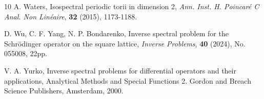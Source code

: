 \documentclass[12pt,letterpaper]{amsart}
\begin{document}
\begin{thebibliography}{10}
 A. Waters,
Isospectral periodic torii in dimension 2,
\emph{Ann. Inst. H. Poincar\'{e} C Anal. Non Lin\'{e}aire}, \textbf{32} (2015), 1173-1188.

 D. Wu, C. F. Yang, N. P. Bondarenko, Inverse spectral problem for the Schr\"{o}dinger
operator on the square lattice, \emph{Inverse Problems}, \textbf{40} (2024), No. 055008, 22pp.

 V. A. Yurko, Inverse spectral problems for differential operators and their applications,
Analytical Methods and Special Functions 2. Gordon and Breach Science Publishers, Amsterdam, 2000.

\end{thebibliography}
\end{document}
